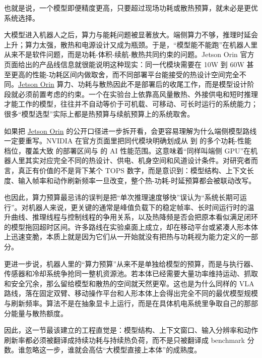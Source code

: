 也就是说，一个模型即便精度更高，只要超过现场功耗或散热预算，就未必是更优系统选择。

大模型进入机器人之后，算力与能耗问题被显著放大。端侧算力不够，推理时延会上升；算力太强，散热和电源设计又成为瓶颈。于是，“模型能不能跑”在机器人里从来不是软件问题，而是功耗-体积-续航-散热共同约束的问题。Jetson Orin 官方页面给出的产品线信息就很能说明这种现实：同一代模块需要在 10W 到 60W 甚至更高的性能-功耗区间内做取舍，而不同部署平台能接受的热设计空间完全不同。\href{https://www.nvidia.com/en-us/autonomous-machines/embedded-systems/jetson-orin/}{Jetson Orin} 算力、功耗与散热因此不是部署后的收尾工作，而是模型设计阶段就必须前置考虑的约束。一个在实验台上依靠高风量散热、外接供电和短时推理才能工作的模型，往往并不自动等价于可机载、可移动、可长时运行的系统能力；很多“模型选型”实际上都是热预算与续航预算上的系统取舍。

如果把 \href{https://www.nvidia.com/en-us/autonomous-machines/embedded-systems/jetson-orin/}{Jetson Orin} 的公开口径进一步拆开看，会更容易理解为什么端侧模型路线一定要重写。NVIDIA 在官方页面里把同代模块明确划成从 \texttt{} 到 \texttt{} 的多个功耗-性能档位，覆盖大致 \texttt{} 的部署区间与 \texttt{} 的 AI 性能范围。这意味着“同样叫端侧 GPU”在机器人里其实对应完全不同的热设计、供电、机身空间和风道设计条件。对研究者而言，真正有价值的不是背下某个 TOPS 数字，而是意识到：模型结构、上下文长度、输入帧率和动作刷新频率一旦改变，整个热-功耗-时延预算都会被联动改写。

也因此，算力预算最忌讳的误判是把“单次推理速度够快”误认为“系统长期可运行”。对机器人来说，更关键的通常是峰值负载下的稳定帧率、长时间运行时的温升曲线、推理线程与控制线程的争用关系，以及热降频是否会把原本看似满足闭环的模型拖回超时区间。许多路线在实验桌面上成立，却在移动平台或紧凑人形本体上迅速变脆，本质上就是因为它们从一开始就没有把热与功耗视为能力定义的一部分。

更进一步说，机器人里的“算力预算”从来不是单独给模型的预算，而是与执行器、传感器和冷却系统争抢同一整机资源池。若本体已经需要大量功率维持运动、抓取和安全冗余，那么留给模型和散热的空间就天然更窄。这也是为什么同样的 VLA 路线，落在固定双臂、移动操作平台和人形本体上会得出完全不同的最优模型规模与刷新频率。算法不是在抽象显卡上运行，而是在具体机电系统里争取自己的那部分能量与散热额度。

因此，这一节最该建立的工程直觉是：模型结构、上下文窗口、输入分辨率和动作刷新率都必须被翻译成持续功耗与持续热负荷，而不是只被翻译成 benchmark 分数。谁忽略这一步，谁就会高估“大模型直接上本体”的成熟度。

